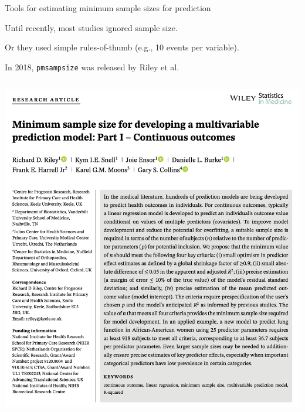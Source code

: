 \documentclass[11pt]{beamer}
\begin{document}
\begin{frame}[t]{Tools for estimating minimum sample sizes for prediction}

    Until recently, most studies ignored sample size.

    Or they used simple rules-of-thumb (e.g., 10 events per variable).

    In 2018, \texttt{pmsampsize} was released by Riley et al.

    \begin{columns}
        \begin{column}[c]{0.5\textwidth}
            \includegraphics[width=\textwidth]{figures/riley1.png}
            	

\end{column}
\end{columns}
\end{frame}
\end{document}
